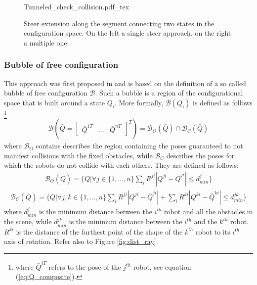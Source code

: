  \begin{figure}
	 \centering
 \def\svgwidth{0.45 \columnwidth}
 {Tunneled_check_collision.pdf_tex} 
	 \caption{Steer extension along the segment connecting two states in the configuration space. On the left a single steer approach, on the right a multiple one.}
 \label{fig:Tunnel_check}
 \end{figure}

\subsubsection{Bubble of free configuration}

This approach was first proposed in \cite{Bubble} and is based on the definition of a so called bubble of free configuration $\mathcal{B}$. Such a bubble is a region of the configurational space that is built around a state $Q_i$. More formally, $\mathcal{B}(Q_i)$ is defined as follows \footnote{where $\bar{Q}^{jT}$ refers to the pose of the $j^{th}$ robot, see equation (\ref{eq:Q_composite}). }
\begin{eqnarray}
\mathcal{B}(\bar{Q} = \begin{bmatrix} \bar{Q}^{1T} & \hdots & \bar{Q}^{nT} \end{bmatrix}^T) = \mathcal{B}_O(\bar{Q}) \cap \mathcal{B}_C(\bar{Q}) 
\end{eqnarray} 
where $\mathcal{B}_O$ contains describes the region containing the poses guaranteed to not manifest collisions with the fixed obstacles, while $\mathcal{B}_C$ describes the poses for which the robots do not collide with each others. They are defined as follows:
\begin{eqnarray}
\mathcal{B}_O(\bar{Q}) =  \bigg \lbrace Q  \bigg | \forall j \in \lbrace 1,\hdots,n \rbrace 
\sum_i R^{ji} | Q^{ji} - \bar{Q}^{ji} | \leq d^j_{min}
\bigg \rbrace 
\end{eqnarray}
\begin{eqnarray}
\mathcal{B}_C(\bar{Q}) =  \bigg \lbrace Q  \bigg | \forall j,k \in \lbrace 1,\hdots,n \rbrace 
\sum_i R^{ji} | Q^{ji} - \bar{Q}^{ji} | + \sum_i R^{ki} | Q^{ki} - \bar{Q}^{ki} | \leq d^{jk}_{min}
\bigg \rbrace 
\end{eqnarray}
where $d^j_{min}$ is the minimum distance between the $i^{th}$ robot and all the obstacles in the scene, while $d^{jk}_{min}$ is the minimum distance between the $i^{th}$ and the $k^{th}$ robot. $R^{ki}$ is the distance of the furthest point of the shape of the $k^{th}$ robot to its $i^{th}$ axis of rotation. Refer also to Figure \ref{fig:dist_ray}.
